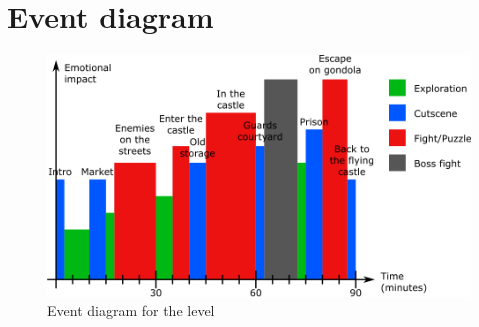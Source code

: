 \section{Event diagram}

\begin{figure}[H]
  \centering
  \includegraphics[width=\textwidth]{../Images/Diagrams/eventDiagram}
  \caption{Event diagram for the level}
\end{figure}
\hspace{0pt} \\ %
